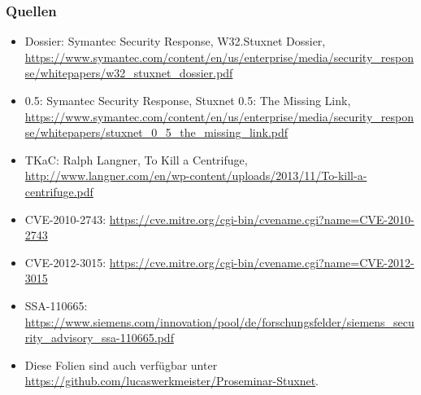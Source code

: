 \documentclass{beamer}
\begin{document}
\begin{frame}
  \frametitle{Quellen}
  \fontsize{6pt}{7.2}\selectfont
  \begin{itemize}
    \item Dossier: Symantec Security Response, W32.Stuxnet Dossier, \url{https://www.symantec.com/content/en/us/enterprise/media/security_response/whitepapers/w32_stuxnet_dossier.pdf}
    \item 0.5: Symantec Security Response, Stuxnet 0.5: The Missing Link, \url{https://www.symantec.com/content/en/us/enterprise/media/security_response/whitepapers/stuxnet_0_5_the_missing_link.pdf}
    \item TKaC: Ralph Langner, To Kill a Centrifuge, \url{http://www.langner.com/en/wp-content/uploads/2013/11/To-kill-a-centrifuge.pdf}
    \item CVE-2010-2743: \url{https://cve.mitre.org/cgi-bin/cvename.cgi?name=CVE-2010-2743}
    \item CVE-2012-3015: \url{https://cve.mitre.org/cgi-bin/cvename.cgi?name=CVE-2012-3015}
    \item SSA-110665: \url{https://www.siemens.com/innovation/pool/de/forschungsfelder/siemens_security_advisory_ssa-110665.pdf}
    \item Diese Folien sind auch verfügbar unter \url{https://github.com/lucaswerkmeister/Proseminar-Stuxnet}.
  \end{itemize}
\end{frame}
\end{document}
